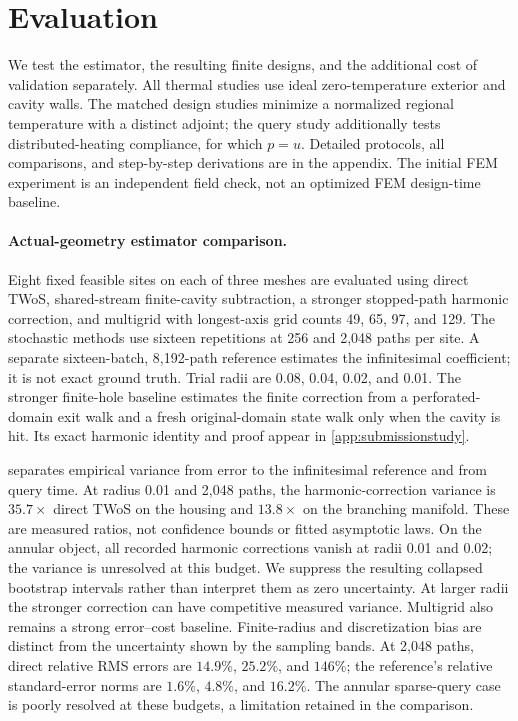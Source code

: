 \section{Evaluation}
\label{eg:results}

We test the estimator, the resulting finite designs, and the additional cost
of validation separately. All thermal studies use ideal zero-temperature
exterior and cavity walls. The matched design studies minimize a normalized
regional temperature with a distinct adjoint; the query study additionally
tests distributed-heating compliance, for which $p=u$. Detailed protocols, all comparisons, and step-by-step derivations are
in the appendix. The initial FEM experiment is an independent field check,
not an optimized FEM design-time baseline.

\paragraph{Actual-geometry estimator comparison.}
Eight fixed feasible sites on each of three meshes are evaluated using direct
TWoS, shared-stream finite-cavity subtraction, a stronger stopped-path harmonic
correction, and multigrid with longest-axis grid counts 49, 65, 97, and 129.
The stochastic methods use sixteen repetitions at 256 and 2,048 paths per
site. A separate sixteen-batch, 8,192-path reference estimates the infinitesimal
coefficient; it is not exact ground truth. Trial radii are 0.08, 0.04, 0.02,
and 0.01. The stronger finite-hole baseline estimates the finite correction
from a perforated-domain exit walk and a fresh original-domain state walk
only when the cavity is hit. Its exact harmonic identity and proof appear in
\cref{app:submissionstudy}.

 separates empirical variance from error to the
infinitesimal reference and from query time. At radius 0.01 and 2,048 paths,
the harmonic-correction variance is $35.7\times$ direct TWoS on the housing
and $13.8\times$ on the branching manifold. These are measured ratios,
not confidence bounds or fitted asymptotic laws. On the annular object,
all recorded harmonic corrections vanish at radii 0.01 and 0.02; the variance
is unresolved at this budget. We suppress the resulting collapsed bootstrap
intervals rather than interpret them as zero uncertainty. At larger radii
the stronger correction can have competitive measured variance. Multigrid
also remains a strong error--cost baseline. Finite-radius and discretization
bias are distinct from the uncertainty shown by the sampling bands.
At 2,048 paths, direct relative RMS errors are $14.9\%$, $25.2\%$, and
$146\%$; the reference's relative standard-error norms are $1.6\%$,
$4.8\%$, and $16.2\%$. The annular sparse-query case is poorly resolved
at these budgets, a limitation retained in the comparison.

